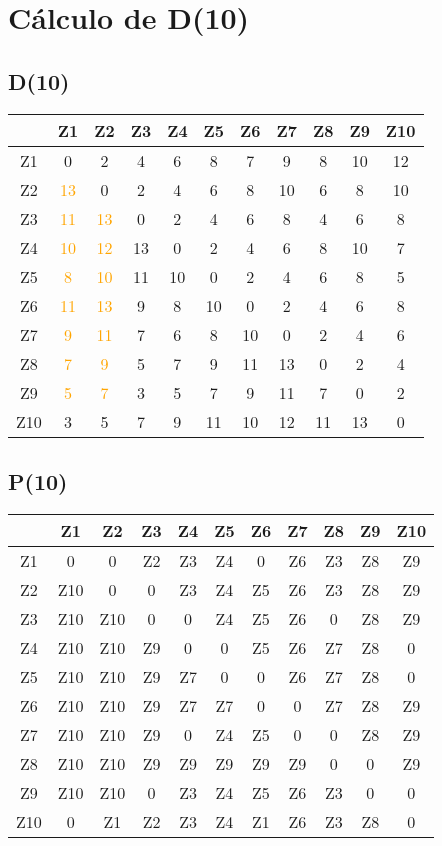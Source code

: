 \documentclass[a4paper,11pt]{article}
\begin{document}
\section*{Cálculo de D(10)}
\subsection*{D(10)}
\begin{center}
\begin{tabular}{c|cccccccccc}
 & Z1 & Z2 & Z3 & Z4 & Z5 & Z6 & Z7 & Z8 & Z9 & Z10 \\ \hline
Z1 & 0 & 2 & 4 & 6 & 8 & 7 & 9 & 8 & 10 & 12 \\
Z2 & \textcolor{orange}{13} & 0 & 2 & 4 & 6 & 8 & 10 & 6 & 8 & 10 \\
Z3 & \textcolor{orange}{11} & \textcolor{orange}{13} & 0 & 2 & 4 & 6 & 8 & 4 & 6 & 8 \\
Z4 & \textcolor{orange}{10} & \textcolor{orange}{12} & 13 & 0 & 2 & 4 & 6 & 8 & 10 & 7 \\
Z5 & \textcolor{orange}{8} & \textcolor{orange}{10} & 11 & 10 & 0 & 2 & 4 & 6 & 8 & 5 \\
Z6 & \textcolor{orange}{11} & \textcolor{orange}{13} & 9 & 8 & 10 & 0 & 2 & 4 & 6 & 8 \\
Z7 & \textcolor{orange}{9} & \textcolor{orange}{11} & 7 & 6 & 8 & 10 & 0 & 2 & 4 & 6 \\
Z8 & \textcolor{orange}{7} & \textcolor{orange}{9} & 5 & 7 & 9 & 11 & 13 & 0 & 2 & 4 \\
Z9 & \textcolor{orange}{5} & \textcolor{orange}{7} & 3 & 5 & 7 & 9 & 11 & 7 & 0 & 2 \\
Z10 & 3 & 5 & 7 & 9 & 11 & 10 & 12 & 11 & 13 & 0 \\
\end{tabular}
\end{center}
\subsection*{P(10)}
\begin{center}
\begin{tabular}{c|cccccccccc}
 & Z1 & Z2 & Z3 & Z4 & Z5 & Z6 & Z7 & Z8 & Z9 & Z10 \\ \hline
Z1 & 0 & 0 & Z2 & Z3 & Z4 & 0 & Z6 & Z3 & Z8 & Z9 \\
Z2 & Z10 & 0 & 0 & Z3 & Z4 & Z5 & Z6 & Z3 & Z8 & Z9 \\
Z3 & Z10 & Z10 & 0 & 0 & Z4 & Z5 & Z6 & 0 & Z8 & Z9 \\
Z4 & Z10 & Z10 & Z9 & 0 & 0 & Z5 & Z6 & Z7 & Z8 & 0 \\
Z5 & Z10 & Z10 & Z9 & Z7 & 0 & 0 & Z6 & Z7 & Z8 & 0 \\
Z6 & Z10 & Z10 & Z9 & Z7 & Z7 & 0 & 0 & Z7 & Z8 & Z9 \\
Z7 & Z10 & Z10 & Z9 & 0 & Z4 & Z5 & 0 & 0 & Z8 & Z9 \\
Z8 & Z10 & Z10 & Z9 & Z9 & Z9 & Z9 & Z9 & 0 & 0 & Z9 \\
Z9 & Z10 & Z10 & 0 & Z3 & Z4 & Z5 & Z6 & Z3 & 0 & 0 \\
Z10 & 0 & Z1 & Z2 & Z3 & Z4 & Z1 & Z6 & Z3 & Z8 & 0 \\
\end{tabular}
\end{center}
\newpage
\end{document}
